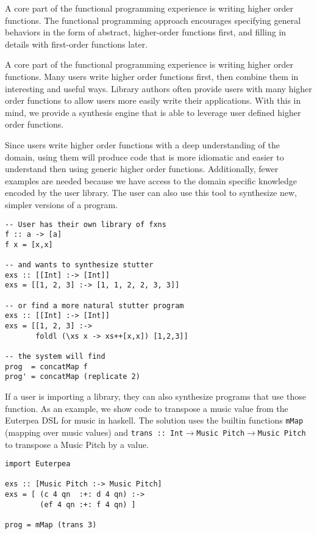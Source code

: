 A core part of the functional programming experience is writing higher order functions. The functional programming approach encourages specifying general behaviors in the form of abstract, higher-order functions first, and filling in details with first-order functions later.

A core part of the functional programming experience is writing higher order functions. Many users write higher order functions first, then combine them in interesting and useful ways. Library authors often provide users with many higher order functions to allow users more easily write their applications. With this in mind, we provide a synthesis engine that is able to leverage user defined higher order functions.

Since users write higher order functions with a deep understanding of the domain, using them will produce code that is more idiomatic and easier to understand then using generic higher order functions. Additionally, fewer examples are needed because we have access to the domain specific knowledge encoded by the user library. The user can also use this tool to synthesize new, simpler versions of a program. 

\begin{lstlisting}
-- User has their own library of fxns
f :: a -> [a]
f x = [x,x]

-- and wants to synthesize stutter
exs :: [[Int] :-> [Int]]
exs = [[1, 2, 3] :-> [1, 1, 2, 2, 3, 3]]

-- or find a more natural stutter program
exs :: [[Int] :-> [Int]]
exs = [[1, 2, 3] :->
       foldl (\xs x -> xs++[x,x]) [1,2,3]]
      
-- the system will find
prog  = concatMap f
prog' = concatMap (replicate 2) 
\end{lstlisting}



If a user is importing a library, they can also synthesize programs that use those function. As an example, we show code to transpose a music value from the Euterpea DSL for music in haskell. The solution uses the builtin functions \texttt{mMap} (mapping over music values) and \texttt{trans :: Int$\to$Music Pitch$\to$Music Pitch} to transpose a Music Pitch by a value.

\begin{lstlisting}
import Euterpea

exs :: [Music Pitch :-> Music Pitch]
exs = [ (c 4 qn  :+: d 4 qn) :->
        (ef 4 qn :+: f 4 qn) ]
        
prog = mMap (trans 3)
\end{lstlisting}
